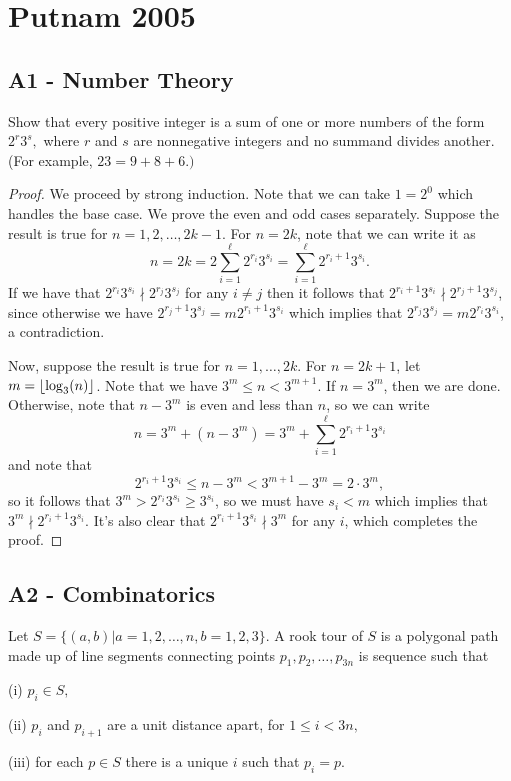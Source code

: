 \documentclass[11pt]{scrartcl}
\newcommand{\<}{\langle}
\renewcommand{\>}{\rangle}
\begin{document}
\section{Putnam 2005}
\subsection{A1 - Number Theory}
Show that every positive integer is a sum of one or more numbers of the form $2^r3^s,$ where $r$ and $s$ are nonnegative integers and no summand divides another.
(For example, $23=9+8+6.)$
\begin{proof}
We proceed by strong induction.  Note that we can take $1 = 2^0$ which handles the base case.  We prove the even and odd cases separately.  Suppose the result is true for $n=1, 2, \dots, 2k-1$.  For $n = 2k$, note that we can write it as 
$$n = 2k = 2\sum_{i=1}^\ell 2^{r_i}3^{s_i} = \sum_{i=1}^{\ell} 2^{r_i + 1} 3^{s_i}.$$
If we have that $2^{r_i}3^{s_i} \nmid 2^{r_j} 3^{s_j}$ for any $i \ne j$ then it follows that $2^{r_i + 1}3^{s_i} \nmid 2^{r_j + 1} 3^{s_j}$, since otherwise we have $2^{r_j + 1} 3^{s_j} = m 2^{r_i + 1}3^{s_i}$ which implies that $2^{r_j} 3^{s_j} = m 2^{r_i}3^{s_i}$, a contradiction.

Now, suppose the result is true for $n = 1, \dots, 2k$.  For $n = 2k+1$, let $m = \left\lfloor \log_3(n) \right\rfloor$.  Note that we have $3^m \le n < 3^{m + 1}$.  If $n = 3^m$, then we are done.  Otherwise, note that $n - 3^m$ is even and less than $n$, so we can write 
$$n = 3^m + (n - 3^m) = 3^m + \sum_{i=1}^\ell 2^{r_i + 1}3^{s_i}$$
and note that 
$$2^{r_i + 1} 3^{s_i} \le n - 3^m < 3^{m + 1} - 3^m = 2 \cdot 3^m,$$
so it follows that $3^m > 2^{r_i}3^{s_i} \ge 3^{s_i}$, so we must have $s_i < m$ which implies that $3^m \nmid 2^{r_i + 1}3^{s_i}$.  It's also clear that $2^{r_i + 1} 3^{s_i }\nmid 3^m$ for any $i$, which completes the proof.
\end{proof}
\pagebreak
\subsection{A2 - Combinatorics}
Let $S=\{(a,b)|a=1,2,\dots,n,b=1,2,3\}$. A rook tour of $S$ is a polygonal path made up of line segments connecting points $p_1,p_2,\dots,p_{3n}$ is sequence such that

(i) $p_i\in S,$

(ii) $p_i$ and $p_{i+1}$ are a unit distance apart, for $1\le i<3n,$

(iii) for each $p\in S$ there is a unique $i$ such that $p_i=p.$
\end{document}
